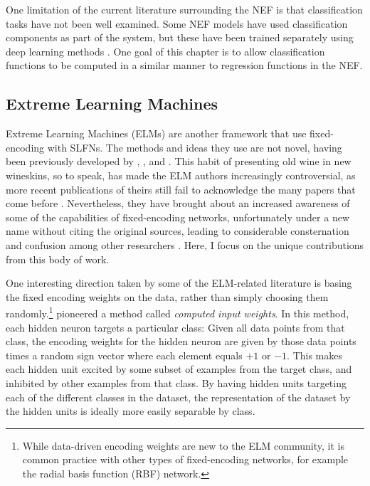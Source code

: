 One limitation of the current literature surrounding the NEF
is that classification tasks have not been well examined.
Some NEF models \parencite[\eg/][]{Eliasmith2012}
have used classification components as part of the system,
but these have been trained separately using deep learning methods \parencite{Tang2010a}.
One goal of this chapter is to allow classification functions
to be computed in a similar manner to regression functions in the NEF.


\subsection{Extreme Learning Machines}

Extreme Learning Machines (ELMs) \parencite{Huang2006}
are another framework that use fixed-encoding with SLFNs.
The methods and ideas they use are not novel,
having been previously developed by
\textcite{Broomhead1988}, \textcite{Pao1992}, and \textcite{Eliasmith1999}.
This habit of presenting old wine in new wineskins, so to speak,
has made the ELM authors increasingly controversial,
as more recent publications of theirs still fail to acknowledge
the many papers that come before \parencite[\eg/][]{Huang2012}.
Nevertheless, they have brought about an increased awareness
of some of the capabilities of fixed-encoding networks,
unfortunately under a new name without citing the original sources,
leading to considerable consternation and confusion among other researchers \parencite{Wang2008}.
Here, I focus on the unique contributions from this body of work.

One interesting direction taken by some of the ELM-related literature
is basing the fixed encoding weights on the data,
rather than simply choosing them randomly.\footnote{
  While data-driven encoding weights are new to the ELM community,
  it is common practice with other types of fixed-encoding networks,
  for example the radial basis function (RBF) network.}
\textcite{Tapson2015} pioneered a method called \emph{computed input weights}.
In this method, each hidden neuron targets a particular class:
Given all data points from that class,
the encoding weights for the hidden neuron are given by
those data points times a random sign vector where each element equals $+1$ or $-1$.
This makes each hidden unit excited by some subset of examples from the target class,
and inhibited by other examples from that class.
By having hidden units targeting each of the different classes in the dataset,
the representation of the dataset by the hidden units is
ideally more easily separable by class.

